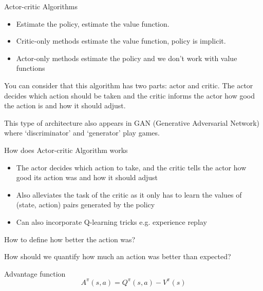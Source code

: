 \documentclass[aspectratio=169,xcolor=dvipsnames,svgnames,x11names,fleqn]{beamer}
\begin{document}
\begin{frame}{Actor-critic Algorithms}
\begin{itemize}
    \item Estimate the policy, estimate the value function.
    \item Critic-only methods estimate the value function, policy is implicit. 
    \item Actor-only methods estimate the policy  and we don't work with value functions
\end{itemize}

\vspace{10pt}
\begin{center}\color{SlateBlue}
    You can consider that this algorithm has two parts: actor and critic. The actor decides which action should be taken and the critic informs the actor how good the action is and how it should adjust. 

    \vspace{10pt}
    \color{Red}
    This type of architecture also appears in GAN (Generative Adversarial Network) where `discriminator' and `generator' play games.
\end{center}    
\end{frame}


\begin{frame}{How does Actor-critic Algorithm works}
\begin{itemize}
    \item The actor decides which action to take, and the critic tells the actor how good its action was and how it should adjust
\item Also alleviates the task of the critic as it only has to learn the values of (state, action) pairs generated by the policy
\item Can also incorporate Q-learning tricks e.g. experience replay
\end{itemize}
\end{frame}

\begin{frame}{How to define how better the action was?}
\begin{center}
    {
    \Large How should we quantify how much an
action was better than expected?
    }
\end{center}
\begin{tblock}{Advantage function}
    $$
A^\pi (s, a) = Q^\pi(s, a) -  V^\pi(s)
$$
\end{tblock}

\end{frame}
\end{document}
